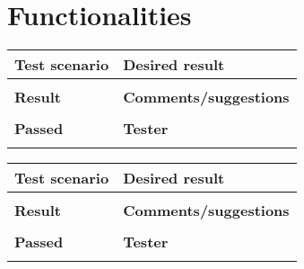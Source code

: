 \section{Functionalities}

\begin{tabularx}{\textwidth}{|X|X|}
\hline
\textbf{Test scenario}   & \textbf{Desired result}       \\ \hline
                         &                               \\ \hline
\textbf{Result}          & \textbf{Comments/suggestions} \\ \hline
                         &                               \\ \hline
\textbf{Passed}          & \textbf{Tester}               \\ \hline
\cellcolor{green} &                               		 \\ \hline
\end{tabularx}

\begin{tabularx}{\textwidth}{|X|X|}
\hline
\textbf{Test scenario}   & \textbf{Desired result}       \\ \hline
                         &                               \\ \hline
\textbf{Result}          & \textbf{Comments/suggestions} \\ \hline
                         &                               \\ \hline
\textbf{Passed}          & \textbf{Tester}               \\ \hline
\cellcolor{red} &                               		 \\ \hline
\end{tabularx}

